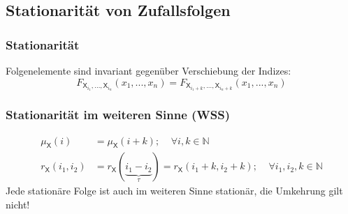 \documentclass[a4paper,twocolumn,10pt]{article}
\begin{document}
\subsection{Stationarität von Zufallsfolgen}

\subsubsection{Stationarität}
Folgenelemente sind invariant gegenüber Verschiebung der Indizes:
\begin{equation*}
F_{\mathsf{X}_{i_1},...,\mathsf{X}_{i_n}}(x_1,...,x_n)=F_{\mathsf{X}_{i_1+k},...,\mathsf{X}_{i_n+k}}(x_1,...,x_n)
\end{equation*}

\subsubsection{Stationarität im weiteren Sinne (WSS)}
\begin{equation*}
\begin{split}
\mu_{\mathsf{X}}(i) &= \mu_{\mathsf{X}}(i+k);\;\;\;\; \forall i,k \in \mathbb{N} \\
r_{\mathsf{X}}(i_1,i_2) &= r_{\mathsf{X}}(\underbrace{i_1 - i_2}_{\tau}) = r_{\mathsf{X}}(i_1 + k, i_2 + k);\;\;\;\; \forall i_1,i_2, k \in \mathbb{N}
\end{split}
\end{equation*}
Jede stationäre Folge ist auch im weiteren Sinne stationär, die Umkehrung gilt nicht!
\end{document}
